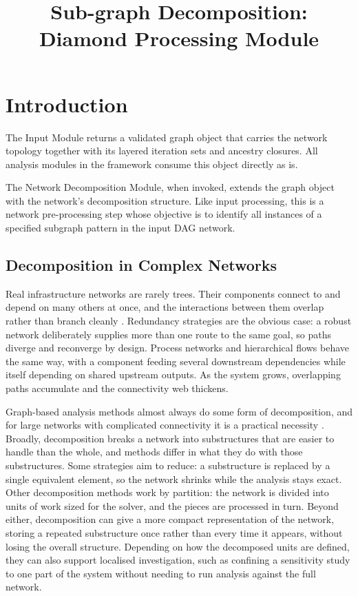 \documentclass[12pt]{report}
\begin{document}
\title{Sub-graph Decomposition: Diamond Processing Module}
\fi

\newcommand{\infl}{\mathrm{infl}}
\newcommand{\Anc}{\mathrm{Anc}}
\newcommand{\topi}{\mathrm{topi}}
\newcommand{\hkey}{\mathrm{hkey}}
\newcommand{\ED}{\mathcal{E}_D}



\section{Introduction}
\label{sec:dd-intro}

The Input Module returns a validated graph object that carries the network topology together with its layered iteration sets and ancestry closures. All analysis modules in the framework consume this object directly as is. 

The Network Decomposition Module, when invoked, extends the graph object with the network's decomposition structure. 
Like input processing, this is a network pre-processing step whose objective is to identify all instances of a specified subgraph pattern in the input DAG network. 

\subsection{Decomposition in Complex Networks}
\label{sec:dd-family}

Real infrastructure networks are rarely trees. Their components connect to
and depend on many others at once, and the interactions between them
overlap rather than branch cleanly \cite{ouyang2014interdependent,buldyrev2010cascade}. Redundancy strategies are the obvious
case: a robust network deliberately supplies more than one route to the
same goal, so paths diverge and reconverge by design. Process networks and
hierarchical flows behave the same way, with a component feeding several
downstream dependencies while itself depending on shared upstream outputs.
As the system grows, overlapping paths accumulate and the connectivity web
thickens.

Graph-based analysis methods almost always do some form of decomposition,
and for large networks with complicated connectivity it is a practical
necessity \cite{perez2018sixty}. Broadly, decomposition breaks a network into substructures that
are easier to handle than the whole, and methods differ in what they do
with those substructures. Some strategies aim to reduce: a substructure is replaced by a
single equivalent element, so the network shrinks while the analysis stays
exact. Other decomposition methods work by partition: the network is divided into units of work sized
for the solver, and the pieces are processed in turn. Beyond either,
decomposition can give a more compact representation of the network,
storing a repeated substructure once rather than every time it appears,
without losing the overall structure. Depending on how the decomposed units are
defined, they can also support localised investigation, such as confining
a sensitivity study to one part of the system without needing to run
analysis against the full network.
\end{document}
